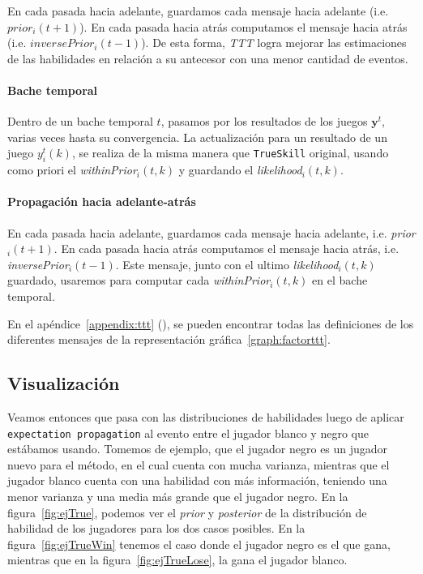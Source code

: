 \documentclass[11pt,twoside,spanish]{report} %
\newcommand{\vm}[1]{\mathbf{#1}}
\begin{document}
En cada pasada hacia adelante, guardamos cada mensaje hacia adelante (i.e. $prior_i(t+1)$).
En cada pasada hacia atr\'as computamos el mensaje hacia atr\'as (i.e. $inversePrior_i(t-1)$).
De esta forma, \textit{TTT} logra mejorar las estimaciones de las habilidades en relaci\'on a su antecesor con una menor cantidad de eventos.


\paragraph{Bache temporal} Dentro de un bache temporal $t$, pasamos por los resultados de los juegos $\vm{y}^t$, varias veces hasta su convergencia.
La actualizaci\'on para un resultado de un juego $y^t_i(k)$, se realiza de la misma manera que \texttt{TrueSkill} original, usando como priori el \emph{withinPrior}$_i(t,k)$ y guardando el \emph{likelihood}$_i(t,k)$.

\paragraph{Propagaci\'on hacia adelante-atr\'as}
En cada pasada hacia adelante, guardamos cada mensaje hacia adelante, i.e. \emph{prior}$_i(t+1)$.
En cada pasada hacia atr\'as computamos el mensaje hacia atr\'as, i.e. \emph{inversePrior}$_i(t-1)$.
Este mensaje, junto con el ultimo \emph{likelihood}$_i(t,k)$ guardado, usaremos para computar cada \emph{withinPrior}$_i(t,k)$ en el bache temporal.

En el ap\'endice~\ref{appendix:ttt} (), se pueden encontrar todas las definiciones de los diferentes mensajes de la representaci\'on gr\'afica~\ref{graph:factorttt}.
 

\vspace{0.3cm}




\subsection{Visualizaci\'on}

Veamos entonces que pasa con las distribuciones de habilidades luego de aplicar                                 
\texttt{expectation propagation} al evento entre el jugador blanco y negro que est\'abamos usando.
Tomemos de ejemplo, que el jugador negro es un jugador nuevo para el m\'etodo, en el cual cuenta con mucha varianza, mientras que el jugador blanco cuenta con una habilidad con m\'as informaci\'on, teniendo una menor varianza y una media m\'as grande que el jugador negro.
En la figura~\ref{fig:ejTrue}, podemos ver el \textit{prior} y \textit{posterior} de la distribuci\'on de habilidad de los jugadores para los dos casos posibles.
En la figura~\ref{fig:ejTrueWin} tenemos el caso donde el jugador negro es el que gana, mientras que en la figura~\ref{fig:ejTrueLose}, la gana el jugador blanco.
\end{document}
